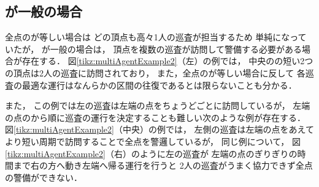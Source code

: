 
\subsection{{\idletime}が一般の場合}
\label{subsec:LineDifferentTimelimit}

全点の{\idletime}が等しい場合は
どの頂点も高々1人の巡査が担当するため
単純になっていたが，
{\idletime}が一般の場合は，
頂点を複数の巡査が訪問して警備する必要がある場合が存在する．
%
図\ref{tikz:multiAgentExample2}（左）の例では，
中央の{\idletime}の短い2つの頂点は2人の巡査に訪問されており，
また，全点の{\idletime}が等しい場合に反して
各巡査の最適な運行はなんらかの区間の往復であるとは限らないことも分かる．


また，
この例では左の巡査は左端の点を{\idletime}ちょうどごとに訪問しているが，
左端の点の{\idletime}から順に巡査の運行を決定することも難しい次のような例が存在する．
図\ref{tikz:multiAgentExample2}（中央）の例では，
左側の巡査は左端の点をあえてより短い周期で訪問することで全点を警邏しているが，
同じ例について，
図\ref{tikz:multiAgentExample2}（右）のように左の巡査が
左端の点の{\idletime}ぎりぎりの時間まで右の方へ動き左端へ帰る運行を行うと
2人の巡査がうまく協力できず全点の警備ができない．

